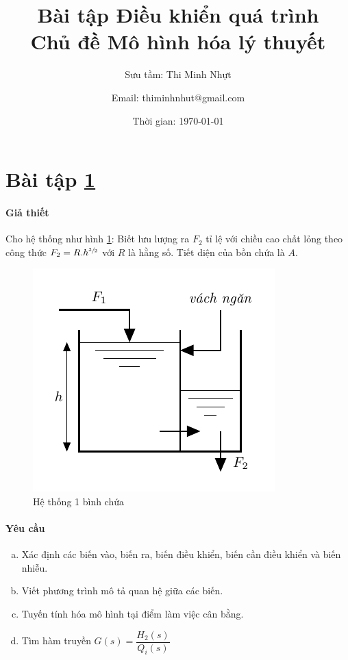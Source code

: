 \documentclass[12pt,a4paper]{article}
\title{\textbf{Bài tập Điều khiển quá trình \bigskip \\ Chủ đề Mô hình hóa lý thuyết}}
\author{Sưu tầm: Thi Minh Nhựt \and Email: thiminhnhut@gmail.com}
\date{Thời gian: \today}
\begin{document}
\maketitle

\section{Bài tập \ref{sec:baitap-1binh-1}} \label{sec:baitap-1binh-1}
    \paragraph{Giả thiết}
        Cho hệ thống như hình \ref{baitap3}: Biết lưu lượng ra $F_2$ tỉ lệ với chiều cao chất lỏng theo công thức $F_2 = R.h^{\sfrac{3}{2}}$ với $R$ là hằng số. Tiết diện của bồn chứa là $A$.
        \begin{figure}[htp]
            \begin{center}
                \includegraphics[scale=1.2]{bai3}
            \end{center}
            \caption{Hệ thống 1 bình chứa} \label{baitap3}
        \end{figure}

    \paragraph{Yêu cầu}
        \begin{enumerate}[a.]
            \item Xác định các biến vào, biến ra, biến điều khiển, biến cần điều khiển và biến nhiễu.
            \item Viết phương trình mô tả quan hệ giữa các biến.
            \item Tuyến tính hóa mô hình tại điểm làm việc cân bằng.
            \item Tìm hàm truyền $G(s) = \dfrac{H_2(s)}{Q_i(s)}$
        \end{enumerate}
\end{document}

